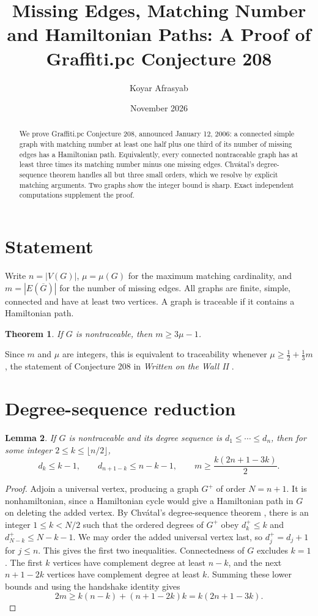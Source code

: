 \documentclass[11pt,a4paper]{article}
\title{Missing Edges, Matching Number and Hamiltonian Paths: A Proof of Graffiti.pc Conjecture 208}
\author{Koyar Afrasyab}
\date{November 2026}
\newtheorem{theorem}{Theorem}
\newtheorem{lemma}[theorem]{Lemma}
\begin{document}
\maketitle
\begin{abstract}
We prove Graffiti.pc Conjecture 208, announced January 12, 2006: a connected simple graph with matching number at least one half plus one third of its number of missing edges has a Hamiltonian path. Equivalently, every connected nontraceable graph has at least three times its matching number minus one missing edges. Chv\'atal's degree-sequence theorem handles all but three small orders, which we resolve by explicit matching arguments. Two graphs show the integer bound is sharp. Exact independent computations supplement the proof.
\end{abstract}
\section{Statement}
Write $n=|V(G)|$, $\mu=\mu(G)$ for the maximum matching cardinality, and $m=|E(\overline G)|$ for the number of missing edges. All graphs are finite, simple, connected and have at least two vertices. A graph is traceable if it contains a Hamiltonian path.
\begin{theorem}\label{main}
If $G$ is nontraceable, then $m\ge3\mu-1$.
\end{theorem}
Since $m$ and $\mu$ are integers, this is equivalent to traceability whenever $\mu\ge \frac12+\frac13m$, the statement of Conjecture 208 in \emph{Written on the Wall II} \cite{wow}.

\section{Degree-sequence reduction}
\begin{lemma}\label{degree}
If $G$ is nontraceable and its degree sequence is $d_1\le\cdots\le d_n$, then for some integer $2\le k\le\lfloor n/2\rfloor$,
\[
d_k\le k-1,\qquad d_{n+1-k}\le n-k-1,
\qquad m\ge \frac{k(2n+1-3k)}2.
\]
\end{lemma}
\begin{proof}
Adjoin a universal vertex, producing a graph $G^+$ of order $N=n+1$. It is nonhamiltonian, since a Hamiltonian cycle would give a Hamiltonian path in $G$ on deleting the added vertex. By Chv\'atal's degree-sequence theorem \cite{chv}, there is an integer $1\le k<N/2$ such that the ordered degrees of $G^+$ obey $d_k^+\le k$ and $d_{N-k}^+\le N-k-1$. We may order the added universal vertex last, so $d_j^+=d_j+1$ for $j\le n$. This gives the first two inequalities. Connectedness of $G$ excludes $k=1$. The first $k$ vertices have complement degree at least $n-k$, and the next $n+1-2k$ vertices have complement degree at least $k$. Summing these lower bounds and using the handshake identity gives
\[
2m\ge k(n-k)+(n+1-2k)k=k(2n+1-3k).
\]
\end{proof}
\end{document}
